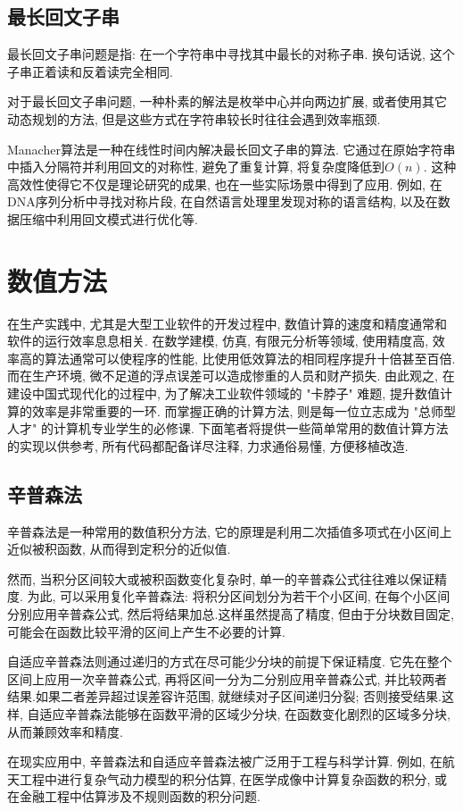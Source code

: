 \documentclass[a4paper]{ctexbook}
\begin{document}


\section{最长回文子串}

最长回文子串问题是指: 在一个字符串中寻找其中最长的对称子串. 换句话说, 这个子串正着读和反着读完全相同.

对于最长回文子串问题, 一种朴素的解法是枚举中心并向两边扩展, 或者使用其它动态规划的方法, 但是这些方式在字符串较长时往往会遇到效率瓶颈.

Manacher算法是一种在线性时间内解决最长回文子串的算法. 它通过在原始字符串中插入分隔符并利用回文的对称性, 避免了重复计算, 将复杂度降低到$O(n)$. 这种高效性使得它不仅是理论研究的成果, 也在一些实际场景中得到了应用. 例如, 在DNA序列分析中寻找对称片段, 在自然语言处理里发现对称的语言结构, 以及在数据压缩中利用回文模式进行优化等.



\chapter{数值方法}

在生产实践中, 尤其是大型工业软件的开发过程中, 数值计算的速度和精度通常和软件的运行效率息息相关. 在数学建模, 仿真, 有限元分析等领域, 使用精度高, 效率高的算法通常可以使程序的性能, 比使用低效算法的相同程序提升十倍甚至百倍. 而在生产环境, 微不足道的浮点误差可以造成惨重的人员和财产损失. 由此观之, 在建设中国式现代化的过程中, 为了解决工业软件领域的 "卡脖子" 难题, 提升数值计算的效率是非常重要的一环. 而掌握正确的计算方法, 则是每一位立志成为 "总师型人才" 的计算机专业学生的必修课. 下面笔者将提供一些简单常用的数值计算方法的实现以供参考, 所有代码都配备详尽注释, 力求通俗易懂, 方便移植改造.

\section{辛普森法}

辛普森法是一种常用的数值积分方法, 它的原理是利用二次插值多项式在小区间上近似被积函数, 从而得到定积分的近似值.

然而, 当积分区间较大或被积函数变化复杂时, 单一的辛普森公式往往难以保证精度. 为此, 可以采用复化辛普森法: 将积分区间划分为若干个小区间, 在每个小区间分别应用辛普森公式, 然后将结果加总.这样虽然提高了精度, 但由于分块数目固定, 可能会在函数比较平滑的区间上产生不必要的计算.

自适应辛普森法则通过递归的方式在尽可能少分块的前提下保证精度. 它先在整个区间上应用一次辛普森公式, 再将区间一分为二分别应用辛普森公式, 并比较两者结果.如果二者差异超过误差容许范围, 就继续对子区间递归分裂; 否则接受结果.这样, 自适应辛普森法能够在函数平滑的区域少分块, 在函数变化剧烈的区域多分块, 从而兼顾效率和精度.

在现实应用中, 辛普森法和自适应辛普森法被广泛用于工程与科学计算. 例如, 在航天工程中进行复杂气动力模型的积分估算, 在医学成像中计算复杂函数的积分, 或在金融工程中估算涉及不规则函数的积分问题.


\end{document}
